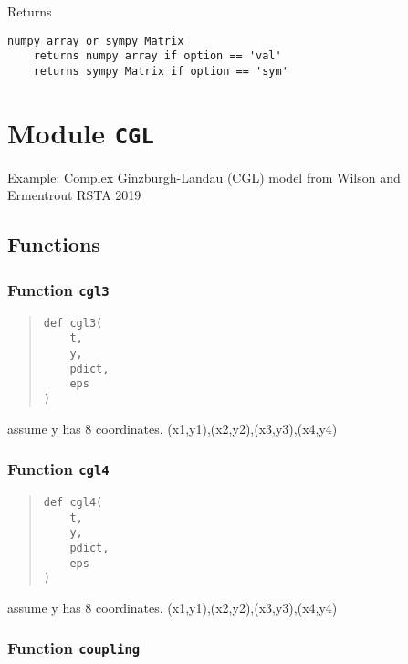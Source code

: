 \documentclass[english,a4paper,oneside]{article}
\begin{document}
Returns

\begin{verbatim}
numpy array or sympy Matrix
    returns numpy array if option == 'val'
    returns sympy Matrix if option == 'sym'
\end{verbatim}

\hypertarget{CGL}{%
\section{\texorpdfstring{Module \texttt{CGL}}{Module CGL}}\label{CGL}}

Example: Complex Ginzburgh-Landau (CGL) model from Wilson and Ermentrout
RSTA 2019

\hypertarget{functions-2}{%
\subsection{Functions}\label{functions-2}}

\hypertarget{CGL.cgl3}{%
\subsubsection{\texorpdfstring{Function
\texttt{cgl3}}{Function cgl3}}\label{CGL.cgl3}}

\begin{quote}
\begin{verbatim}
def cgl3(
    t,
    y,
    pdict,
    eps
)
\end{verbatim}
\end{quote}

assume y has 8 coordinates. (x1,y1),(x2,y2),(x3,y3),(x4,y4)

\hypertarget{CGL.cgl4}{%
\subsubsection{\texorpdfstring{Function
\texttt{cgl4}}{Function cgl4}}\label{CGL.cgl4}}

\begin{quote}
\begin{verbatim}
def cgl4(
    t,
    y,
    pdict,
    eps
)
\end{verbatim}
\end{quote}

assume y has 8 coordinates. (x1,y1),(x2,y2),(x3,y3),(x4,y4)

\hypertarget{CGL.coupling}{%
\subsubsection{\texorpdfstring{Function
\texttt{coupling}}{Function coupling}}\label{CGL.coupling}}
\end{document}
